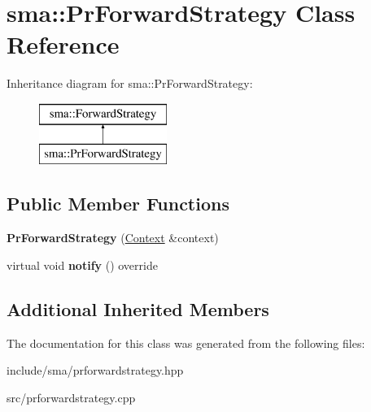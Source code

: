 \hypertarget{classsma_1_1PrForwardStrategy}{\section{sma\-:\-:Pr\-Forward\-Strategy Class Reference}
\label{classsma_1_1PrForwardStrategy}
}
Inheritance diagram for sma\-:\-:Pr\-Forward\-Strategy\-:\begin{figure}[H]
\begin{center}
\leavevmode
\includegraphics[height=2.000000cm]{classsma_1_1PrForwardStrategy}
\end{center}
\end{figure}
\subsection*{Public Member Functions}
\begin{DoxyCompactItemize}
\item 
\hypertarget{classsma_1_1PrForwardStrategy_ae508d4c9e3a112ca6df7cf025c9a5587}{{\bfseries Pr\-Forward\-Strategy} (\hyperlink{structsma_1_1Context}{Context} \&context)}\label{classsma_1_1PrForwardStrategy_ae508d4c9e3a112ca6df7cf025c9a5587}

\item 
\hypertarget{classsma_1_1PrForwardStrategy_a2eba4c66a85abd1083c76373a724e57f}{virtual void {\bfseries notify} () override}\label{classsma_1_1PrForwardStrategy_a2eba4c66a85abd1083c76373a724e57f}

\end{DoxyCompactItemize}
\subsection*{Additional Inherited Members}


The documentation for this class was generated from the following files\-:\begin{DoxyCompactItemize}
\item 
include/sma/prforwardstrategy.\-hpp\item 
src/prforwardstrategy.\-cpp\end{DoxyCompactItemize}
